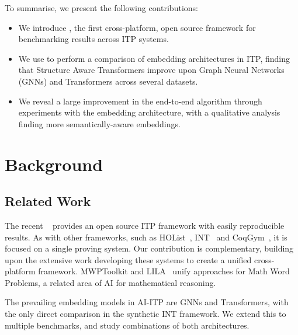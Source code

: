 \documentclass[letterpaper]{article} %
\newcommand{\sysname}{\textsc{\sffamily{Bait}}}
\newcommand\alg[1]{\textsc{\sffamily{#1}}}%
\newcommand\dataset[1]{#1}
\begin{document}
    \noindent To summarise, we present the following contributions:
    \begin{itemize}
        \item We introduce \sysname{}, the first cross-platform, open source
        framework for benchmarking results across ITP systems.
        \item We use \sysname{} to perform a comparison of embedding architectures in ITP, finding that Structure Aware Transformers \cite{chen_structure-aware_2022, luo_transformers_2023} improve upon Graph Neural Networks (GNNs) and Transformers across several datasets.
        \item We reveal a large improvement in the end-to-end \alg{TacticZero} \cite{wu_tacticzero_2021} algorithm through experiments with the embedding architecture, with a qualitative analysis finding more semantically-aware embeddings.
    \end{itemize}


    \section{Background}

    \subsection{Related Work}
    The recent \alg{LeanDojo}~\cite{yang_leandojo_2023} provides an open source ITP framework with easily reproducible results.
    As with other frameworks, such as \dataset{HOList}~\cite{bansal_holist_2019}, INT~\cite{wu_int_2020} and CoqGym~\cite{yang_learning_2019}, it is focused on a single proving system.
    Our contribution is complementary, building upon the extensive work developing these systems
    to create a unified cross-platform framework.
    MWPToolkit and LILA~\cite{lan_mwptoolkit_2022, mishra_lila_2022}
    unify approaches for Math Word Problems, a related area of AI for mathematical reasoning.

    The prevailing embedding models in AI-ITP are GNNs and Transformers, with the only direct comparison in the synthetic INT \cite{wu_int_2020} framework.
    We extend this to multiple benchmarks, and study combinations of both architectures.
\end{document}
